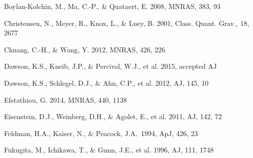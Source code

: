 \documentclass[prl,twocolumn,superscriptaddress,aps,amsmath,amssymb,nofootinbib,altaffilletter]{revtex4}
\begin{document}
\begin{thebibliography}{}
Boylan-Kolchin, M., Ma, C.-P., \& Quataert, E. 2008, MNRAS, 383, 93






Christensen, N., Meyer, R., Knox, L., \& Luey, B. 2001, Class. Quant. Grav., 18, 2677


Chuang, C.-H., \& Wang, Y. 2012, MNRAS, 426, 226  



Dawson, K.S., Kneib, J.P., \& Percival, W.J., et al. 2015, accepted AJ

Dawson, K.S., Schlegel, D.J., \& Ahn, C.P., et al. 2012, AJ, 145, 10

Efstathiou, G. 2014, MNRAS, 440, 1138

Eisenstein, D.J.,  Weinberg, D.H., \& Agolet, E., et al. 2011, AJ, 142, 72

Feldman, H.A., Kaiser, N., \& Peacock, J.A.\ 1994, ApJ, 426, 23 

Fukugita, M., Ichikawa, T., \& Gunn, J.E., et al. 1996, AJ, 111, 1748




\end{thebibliography}
\end{document}
